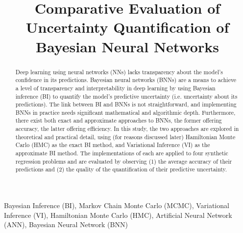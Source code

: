 \documentclass[conference]{IEEEtran}
\begin{document}


\title{Comparative Evaluation of Uncertainty Quantification of Bayesian Neural Networks\\}

\author{}

\maketitle

\begin{abstract}
Deep learning using neural networks (NNs) lacks transparency about the model's confidence in its predictions. Bayesian neural networks (BNNs) are a means to achieve a level of transparency and interpretability in deep learning by using Bayesian inference (BI) to quantify the model's predictive uncertainty (i.e. uncertainty about its predictions). The link between BI and BNNs is not straightforward, and implementing BNNs in practice needs significant mathematical and algorithmic depth. Furthermore, there exist both exact and approximate approaches to BNNs, the former offering accuracy, the latter offering efficiency. In this study, the two approaches are explored in theoretical and practical detail, using (for reasons discussed later) Hamiltonian Monte Carlo (HMC) as the exact BI method, and Variational Inference (VI) as the approximate BI method. The implementations of each are applied to four synthetic regression problems and are evaluated by observing (1) the average accuracy of their predictions and (2) the quality of the quantification of their predictive uncertainty.\\
\end{abstract}

\begin{IEEEkeywords}
Bayesian Inference (BI), Markov Chain Monte Carlo (MCMC), Variational Inference (VI), Hamiltonian Monte Carlo (HMC), Artificial Neural Network (ANN), Bayesian Neural Network (BNN)
\end{IEEEkeywords}
\end{document}
